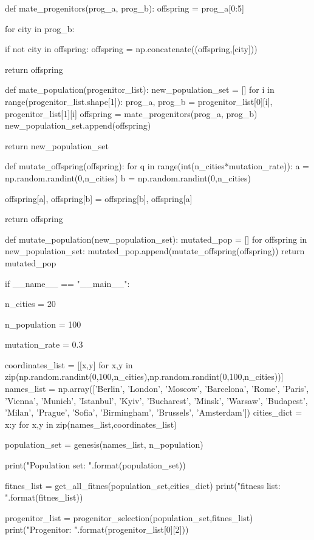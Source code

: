 \documentclass[14pt, a4paper]{article}
\theoremstyle{sltheorem}
\theoremstyle{soltheorem}
\begin{document}
\begin{python}
def mate_progenitors(prog_a, prog_b):
    offspring = prog_a[0:5]

    for city in prog_b:

        if not city in offspring:
            offspring = np.concatenate((offspring,[city]))

    return offspring
            
    
    
def mate_population(progenitor_list):
    new_population_set = []
    for i in range(progenitor_list.shape[1]):
        prog_a, prog_b = progenitor_list[0][i], progenitor_list[1][i]
        offspring = mate_progenitors(prog_a, prog_b)
        new_population_set.append(offspring)
        
    return new_population_set


def mutate_offspring(offspring):
    for q in range(int(n_cities*mutation_rate)):
        a = np.random.randint(0,n_cities)
        b = np.random.randint(0,n_cities)

        offspring[a], offspring[b] = offspring[b], offspring[a]

    return offspring
    
    
def mutate_population(new_population_set):
    mutated_pop = []
    for offspring in new_population_set:
        mutated_pop.append(mutate_offspring(offspring))
    return mutated_pop


if __name__ == "__main__":

    n_cities = 20

    n_population = 100

    mutation_rate = 0.3

    coordinates_list = [[x,y] for x,y in zip(np.random.randint(0,100,n_cities),np.random.randint(0,100,n_cities))]
    names_list = np.array(['Berlin', 'London', 'Moscow', 'Barcelona', 'Rome', 'Paris', 'Vienna', 'Munich', 'Istanbul', 'Kyiv', 'Bucharest', 'Minsk', 'Warsaw', 'Budapest', 'Milan', 'Prague', 'Sofia', 'Birmingham', 'Brussels', 'Amsterdam'])
    cities_dict = { x:y for x,y in zip(names_list,coordinates_list)}

    population_set = genesis(names_list, n_population)

    print("Population set: {}".format(population_set))

    fitnes_list = get_all_fitnes(population_set,cities_dict)
    print("fitness list: {}".format(fitnes_list))

    progenitor_list = progenitor_selection(population_set,fitnes_list)
    print("Progenitor: {}".format(progenitor_list[0][2]))


\end{python}
\end{document}
